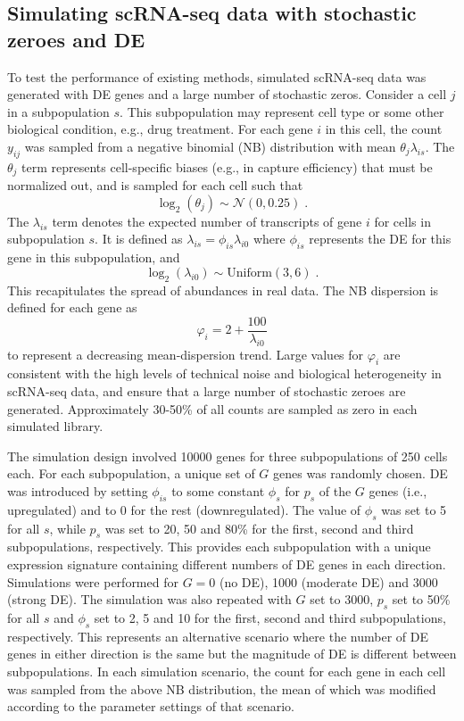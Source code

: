 \documentclass{bmcart}
\begin{document}
\subsection*{Simulating scRNA-seq data with stochastic zeroes and DE}
To test the performance of existing methods, simulated scRNA-seq data was generated with DE genes and a large number of stochastic zeros.
Consider a cell $j$ in a subpopulation $s$.
This subpopulation may represent cell type or some other biological condition, e.g., drug treatment. 
For each gene $i$ in this cell, the count $y_{ij}$ was sampled from a negative binomial (NB) distribution with mean $\theta_{j}\lambda_{is}$.
The $\theta_{j}$ term represents cell-specific biases (e.g., in capture efficiency) that must be normalized out, 
    and is sampled for each cell such that 
\[
\log_2(\theta_j) \sim \mathcal{N}(0, 0.25) \;.
\]
The $\lambda_{is}$ term denotes the expected number of transcripts of gene $i$ for cells in subpopulation $s$.
It is defined as $\lambda_{is}=\phi_{is}\lambda_{i0}$ where $\phi_{is}$ represents the DE for this gene in this subpopulation, and 
\[
\log_2(\lambda_{i0}) \sim \mbox{Uniform}(3, 6) \;.
\]
This recapitulates the spread of abundances in real data.
The NB dispersion is defined for each gene as 
\[
    \varphi_i = 2 + \frac{100}{\lambda_{i0}}
\]
to represent a decreasing mean-dispersion trend.
Large values for $\varphi_i$ are consistent with the high levels of technical noise and biological heterogeneity in scRNA-seq data,
    and ensure that a large number of stochastic zeroes are generated.
Approximately 30-50\% of all counts are sampled as zero in each simulated library.

The simulation design involved 10000 genes for three subpopulations of 250 cells each.
For each subpopulation, a unique set of $G$ genes was randomly chosen.
DE was introduced by setting $\phi_{is}$ to some constant $\phi_s$ for $p_s$ of the $G$ genes (i.e., upregulated) and to $0$ for the rest (downregulated).
The value of $\phi_s$ was set to 5 for all $s$, while $p_s$ was set to 20, 50 and 80\% for the first, second and third subpopulations, respectively.
This provides each subpopulation with a unique expression signature containing different numbers of DE genes in each direction.
Simulations were performed for $G = 0$ (no DE), 1000 (moderate DE) and 3000 (strong DE).
The simulation was also repeated with $G$ set to 3000, $p_s$ set to 50\% for all $s$ and $\phi_{s}$ set to 2, 5 and 10 for the first, second and third subpopulations, respectively.
This represents an alternative scenario where the number of DE genes in either direction is the same but the magnitude of DE is different between subpopulations.
In each simulation scenario, the count for each gene in each cell was sampled from the above NB distribution,
    the mean of which was modified according to the parameter settings of that scenario.
\end{document}
